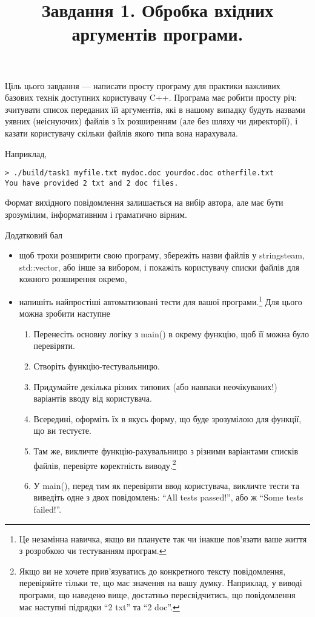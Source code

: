 \documentclass[12pt]{article}
\title{Завдання 1. Обробка вхідних аргументів програми.}
\begin{document}
\maketitle

Ціль цього завдання — написати просту програму для практики важливих базових технік доступних користувачу C++. Програма має робити просту річ: зчитувати список переданих їй аргументів, які в нашому випадку будуть назвами уявних (неіснуючих) файлів з їх розширенням (але без шляху чи директорії), і казати користувачу скільки файлів якого типа вона нарахувала. 

Наприклад,

\begin{lstlisting}
> ./build/task1 myfile.txt mydoc.doc yourdoc.doc otherfile.txt
You have provided 2 txt and 2 doc files.
\end{lstlisting}

Формат вихідного повідомлення залишається на вибір автора, але має бути зрозумілим, інформативним і граматично вірним.

\begin{center}
    \large{Додатковий бал}
\end{center}

\begin{itemize}
\item щоб трохи розширити свою програму, збережіть назви файлів у stringsteam, std::vector, або інше за вибором, і покажіть користувачу списки файлів для кожного розширення окремо,
\item напишіть найпростіші автоматизовані тести для вашої програми.\footnote{Це незамінна навичка, якщо ви плануєте так чи інакше пов'язати ваше життя з розробкою чи тестуванням програм.}
Для цього можна зробити наступне
\begin{enumerate}
    \item Перенесіть основну логіку з main() в окрему функцію, щоб її можна було перевіряти.
    \item Створіть функцію-тестувальницю.
    \item Придумайте декілька різних типових (або навпаки неочікуваних!) варіантів вводу від користувача.
    \item Всередині, оформіть їх в якусь форму, що буде зрозумілою для функції, що ви тестуєте.
    \item Там же, викличте функцію-рахувальницю з різними варіантами списків файлів, перевірте коректність виводу.\footnote{Якщо ви не хочете прив'язуватись до конкретного тексту повідомлення, перевіряйте тільки те, що має значення на вашу думку. Наприклад, у виводі програми, що наведено вище, достатньо пересвідчитись, що повідомлення має наступні підрядки ``2 txt'' та ``2 doc''.}
    \item У main(), перед тим як перевіряти ввод користувача, викличте тести та виведіть одне з двох повідомлень: ``All tests passed!'', або ж  ``Some tests failed!''.
\end{enumerate}
\end{itemize}
\end{document}
